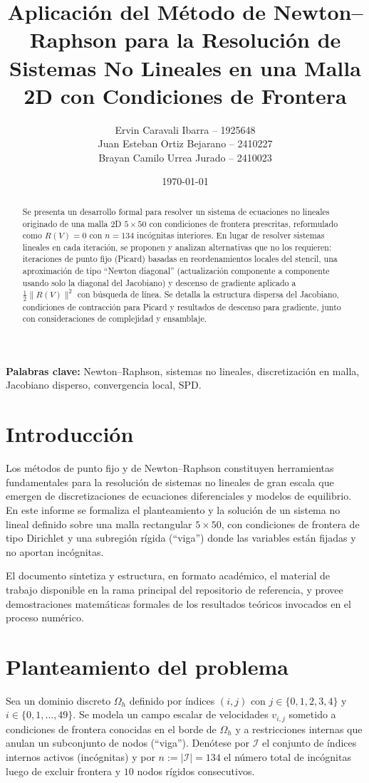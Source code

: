 \documentclass[12pt,letterpaper]{article}
\title{Aplicación del Método de Newton--Raphson para la Resolución de Sistemas No Lineales en una Malla 2D con Condiciones de Frontera}
\author{Ervin Caravali Ibarra -- 1925648\\Juan Esteban Ortiz Bejarano -- 2410227\\Brayan Camilo Urrea Jurado -- 2410023}
\date{\today}
\theoremstyle{definition}
\theoremstyle{remark}
\newcommand{\norm}[1]{\lVert #1\rVert}
\newcommand{\abs}[1]{\lvert #1\rvert}
\begin{document}
\maketitle

\begin{abstract}
Se presenta un desarrollo formal para resolver un sistema de ecuaciones no lineales originado de una malla 2D $5\times 50$ con condiciones de frontera prescritas, reformulado como $R(V)=0$ con $n=134$ incógnitas interiores. En lugar de resolver sistemas lineales en cada iteración, se proponen y analizan alternativas que no los requieren: iteraciones de punto fijo (Picard) basadas en reordenamientos locales del stencil, una aproximación de tipo ``Newton diagonal'' (actualización componente a componente usando solo la diagonal del Jacobiano) y descenso de gradiente aplicado a $\tfrac{1}{2}\norm{R(V)}^2$ con búsqueda de línea. Se detalla la estructura dispersa del Jacobiano, condiciones de contracción para Picard y resultados de descenso para gradiente, junto con consideraciones de complejidad y ensamblaje.
\end{abstract}

\noindent\textbf{Palabras clave:} Newton--Raphson, sistemas no lineales, discretización en malla, Jacobiano disperso, convergencia local, SPD.

\section{Introducción}
Los métodos de punto fijo y de Newton--Raphson constituyen herramientas fundamentales para la resolución de sistemas no lineales de gran escala que emergen de discretizaciones de ecuaciones diferenciales y modelos de equilibrio. En este informe se formaliza el planteamiento y la solución de un sistema no lineal definido sobre una malla rectangular $5\times 50$, con condiciones de frontera de tipo Dirichlet y una subregión rígida (``viga'') donde las variables están fijadas y no aportan incógnitas.

El documento sintetiza y estructura, en formato académico, el material de trabajo disponible en la rama principal del repositorio de referencia, y provee demostraciones matemáticas formales de los resultados teóricos invocados en el proceso numérico.

\section{Planteamiento del problema}
Sea un dominio discreto $\Omega_h$ definido por índices $(i,j)$ con $j\in\{0,1,2,3,4\}$ y $i\in\{0,1,\dots,49\}$. Se modela un campo escalar de velocidades $v_{i,j}$ sometido a condiciones de frontera conocidas en el borde de $\Omega_h$ y a restricciones internas que anulan un subconjunto de nodos (``viga''). Denótese por $\mathcal{I}$ el conjunto de índices internos activos (incógnitas) y por $n:=\abs{\mathcal{I}}=134$ el número total de incógnitas luego de excluir frontera y $10$ nodos rígidos consecutivos.
\end{document}
